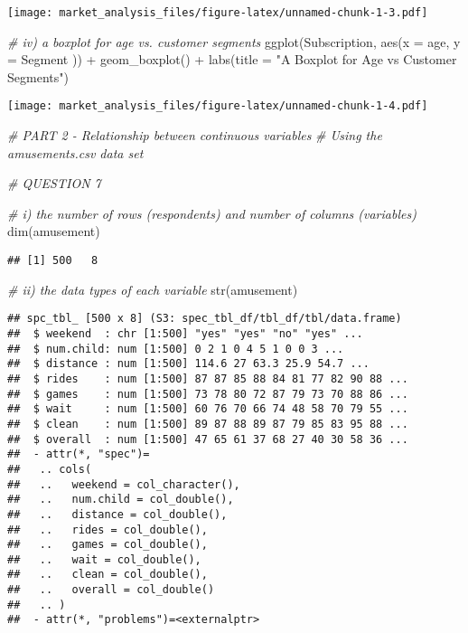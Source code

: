 \documentclass[
]{article}
\newenvironment{Shaded}{\begin{snugshade}}{\end{snugshade}}
\newcommand{\AttributeTok}[1]{\textcolor[rgb]{0.77,0.63,0.00}{#1}}
\newcommand{\CommentTok}[1]{\textcolor[rgb]{0.56,0.35,0.01}{\textit{#1}}}
\newcommand{\FunctionTok}[1]{\textcolor[rgb]{0.00,0.00,0.00}{#1}}
\newcommand{\NormalTok}[1]{#1}
\newcommand{\SpecialCharTok}[1]{\textcolor[rgb]{0.00,0.00,0.00}{#1}}
\newcommand{\StringTok}[1]{\textcolor[rgb]{0.31,0.60,0.02}{#1}}
\begin{document}
\texttt{[image: market\_analysis\_files/figure-latex/unnamed-chunk-1-3.pdf]}

\begin{Shaded}
\begin{Highlighting}[]
\CommentTok{\# iv)  a boxplot for age vs. customer segments}
\FunctionTok{ggplot}\NormalTok{(Subscription, }\FunctionTok{aes}\NormalTok{(}\AttributeTok{x =}\NormalTok{ age, }\AttributeTok{y =}\NormalTok{ Segment )) }\SpecialCharTok{+} \FunctionTok{geom\_boxplot}\NormalTok{() }\SpecialCharTok{+}
  \FunctionTok{labs}\NormalTok{(}\AttributeTok{title =} \StringTok{"A Boxplot for Age vs Customer Segments"}\NormalTok{)}
\end{Highlighting}
\end{Shaded}

\texttt{[image: market\_analysis\_files/figure-latex/unnamed-chunk-1-4.pdf]}

\begin{Shaded}
\begin{Highlighting}[]
\CommentTok{\# PART 2 {-} Relationship between continuous variables}
\CommentTok{\# Using the amusements.csv data set}

\CommentTok{\# QUESTION 7}

\CommentTok{\# i) the number of rows (respondents) and number of columns (variables)}
\FunctionTok{dim}\NormalTok{(amusement)}
\end{Highlighting}
\end{Shaded}

\begin{verbatim}
## [1] 500   8
\end{verbatim}

\begin{Shaded}
\begin{Highlighting}[]
\CommentTok{\# ii) the data types of each variable}
\FunctionTok{str}\NormalTok{(amusement)}
\end{Highlighting}
\end{Shaded}

\begin{verbatim}
## spc_tbl_ [500 x 8] (S3: spec_tbl_df/tbl_df/tbl/data.frame)
##  $ weekend  : chr [1:500] "yes" "yes" "no" "yes" ...
##  $ num.child: num [1:500] 0 2 1 0 4 5 1 0 0 3 ...
##  $ distance : num [1:500] 114.6 27 63.3 25.9 54.7 ...
##  $ rides    : num [1:500] 87 87 85 88 84 81 77 82 90 88 ...
##  $ games    : num [1:500] 73 78 80 72 87 79 73 70 88 86 ...
##  $ wait     : num [1:500] 60 76 70 66 74 48 58 70 79 55 ...
##  $ clean    : num [1:500] 89 87 88 89 87 79 85 83 95 88 ...
##  $ overall  : num [1:500] 47 65 61 37 68 27 40 30 58 36 ...
##  - attr(*, "spec")=
##   .. cols(
##   ..   weekend = col_character(),
##   ..   num.child = col_double(),
##   ..   distance = col_double(),
##   ..   rides = col_double(),
##   ..   games = col_double(),
##   ..   wait = col_double(),
##   ..   clean = col_double(),
##   ..   overall = col_double()
##   .. )
##  - attr(*, "problems")=<externalptr>
\end{verbatim}
\end{document}
